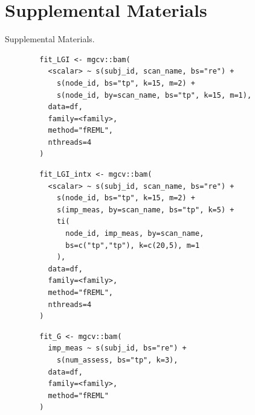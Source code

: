 \documentclass[12pt]{article}
\newcommand{\beginsupplement}{%
	\setcounter{table}{0}
	\renewcommand{\thetable}{S\arabic{table}}%
	\setcounter{figure}{0}
	\renewcommand{\thefigure}{S\arabic{figure}}%
}
\begin{document}
\section{Supplemental Materials}
\label{sec:supp-materials}
\beginsupplement
Supplemental Materials.


\begin{equ}[H]
	\begin{lstlisting}
		fit_LGI <- mgcv::bam(
		  <scalar> ~ s(subj_id, scan_name, bs="re") +
		    s(node_id, bs="tp", k=15, m=2) +
		    s(node_id, by=scan_name, bs="tp", k=15, m=1),
		  data=df,
		  family=<family>,
		  method="fREML",
		  nthreads=4
		)
	\end{lstlisting}
	\caption{Tract scalars are modeled as a function of tract node with thin-plate regression splines using both global and group (\lstinline{scan_name}) smooths as well as individual group wiggliness. \lstinline{<scalar>} = relevant DWI metric (AD, RD, MD, or FA), \lstinline{scan_name} = session identifier factor (Base, Post, RTP), \lstinline{<family>} = relevant family and link function for scalar distribution.}
	\label{supp-code:gam-lgi}
\end{equ}


\begin{equ}[H]
	\begin{lstlisting}
		fit_LGI_intx <- mgcv::bam(
		  <scalar> ~ s(subj_id, scan_name, bs="re") +
		    s(node_id, bs="tp", k=15, m=2) +
		    s(imp_meas, by=scan_name, bs="tp", k=5) +
		    ti(
		      node_id, imp_meas, by=scan_name,
		      bs=c("tp","tp"), k=c(20,5), m=1
		    ),
		  data=df,
		  family=<family>,
		  method="fREML",
		  nthreads=4
		)
	\end{lstlisting}
	\caption{Tract scalars are modeled as a function of separate 1D node and ImPACT smooths as well as a 2D tensor product interaction surface. \lstinline{imp_meas} = ImPACT composite or total symptom measure.}
	\label{supp-code:gam-lgi-intx}
\end{equ}


\begin{equ}[H]
	\begin{lstlisting}
		fit_G <- mgcv::bam(
		  imp_meas ~ s(subj_id, bs="re") +
		    s(num_assess, bs="tp", k=3),
		  data=df,
		  family=<family>,
		  method="fREML"
		)
	\end{lstlisting}
	\caption{ImPACT metrics modeled as a function of number of assessments using a single global smooth. \lstinline{imp_meas} = ImPACT composite or total symptom score, \lstinline{num_assess} = assessment number (1=Base, 2=Post, 3=RTP).}
	\label{supp-code:gam-impact}
\end{equ}
\end{document}

